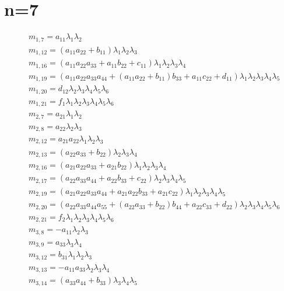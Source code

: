 \documentclass{article}
\begin{document}
\section{n=7}
\begin{align*}
&m_{1,7}=a_{11} \lambda_{1} \lambda_{2}\\
&m_{1,12}={\left(a_{11} a_{22} + b_{11}\right)} \lambda_{1} \lambda_{2} \lambda_{3}\\
&m_{1,16}={\left(a_{11} a_{22} a_{33} + a_{11} b_{22} + c_{11}\right)} \lambda_{1} \lambda_{2} \lambda_{3} \lambda_{4}\\
&m_{1,19}={\left(a_{11} a_{22} a_{33} a_{44} + {\left(a_{11} a_{22} + b_{11}\right)} b_{33} + a_{11} c_{22} + d_{11}\right)} \lambda_{1} \lambda_{2} \lambda_{3} \lambda_{4} \lambda_{5}\\
&m_{1,20}=d_{12} \lambda_{2} \lambda_{3} \lambda_{4} \lambda_{5} \lambda_{6}\\
&m_{1,21}=f_{1} \lambda_{1} \lambda_{2} \lambda_{3} \lambda_{4} \lambda_{5} \lambda_{6}\\
&m_{2,7}=a_{21} \lambda_{1} \lambda_{2}\\
&m_{2,8}=a_{22} \lambda_{2} \lambda_{3}\\
&m_{2,12}=a_{21} a_{22} \lambda_{1} \lambda_{2} \lambda_{3}\\
&m_{2,13}={\left(a_{22} a_{33} + b_{22}\right)} \lambda_{2} \lambda_{3} \lambda_{4}\\
&m_{2,16}={\left(a_{21} a_{22} a_{33} + a_{21} b_{22}\right)} \lambda_{1} \lambda_{2} \lambda_{3} \lambda_{4}\\
&m_{2,17}={\left(a_{22} a_{33} a_{44} + a_{22} b_{33} + c_{22}\right)} \lambda_{2} \lambda_{3} \lambda_{4} \lambda_{5}\\
&m_{2,19}={\left(a_{21} a_{22} a_{33} a_{44} + a_{21} a_{22} b_{33} + a_{21} c_{22}\right)} \lambda_{1} \lambda_{2} \lambda_{3} \lambda_{4} \lambda_{5}\\
&m_{2,20}={\left(a_{22} a_{33} a_{44} a_{55} + {\left(a_{22} a_{33} + b_{22}\right)} b_{44} + a_{22} c_{33} + d_{22}\right)} \lambda_{2} \lambda_{3} \lambda_{4} \lambda_{5} \lambda_{6}\\
&m_{2,21}=f_{2} \lambda_{1} \lambda_{2} \lambda_{3} \lambda_{4} \lambda_{5} \lambda_{6}\\
&m_{3,8}=-a_{11} \lambda_{2} \lambda_{3}\\
&m_{3,9}=a_{33} \lambda_{3} \lambda_{4}\\
&m_{3,12}=b_{31} \lambda_{1} \lambda_{2} \lambda_{3}\\
&m_{3,13}=-a_{11} a_{33} \lambda_{2} \lambda_{3} \lambda_{4}\\
&m_{3,14}={\left(a_{33} a_{44} + b_{33}\right)} \lambda_{3} \lambda_{4} \lambda_{5}\\
\end{align*}
\end{document}
